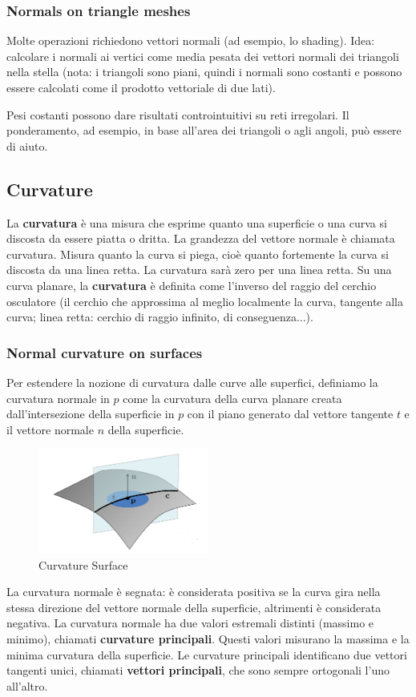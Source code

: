 \subsubsection{Normals on triangle meshes}
Molte operazioni richiedono vettori normali (ad esempio, lo shading). Idea: calcolare i normali ai vertici come media pesata dei vettori normali dei triangoli nella stella (nota: i triangoli sono piani, quindi i normali sono costanti e possono essere calcolati come il prodotto vettoriale di due lati).

Pesi costanti possono dare risultati controintuitivi su reti irregolari. Il ponderamento, ad esempio, in base all'area dei triangoli o agli angoli, può essere di aiuto.
\subsection{Curvature}
La \textbf{curvatura} è una misura che esprime quanto una superficie o una curva si discosta da essere piatta o dritta.
La grandezza del vettore normale è chiamata curvatura. Misura quanto la curva si piega, cioè quanto fortemente la curva si discosta da una linea retta. La curvatura sarà zero per una linea retta.
Su una curva planare, la \textbf{curvatura} è definita come l'inverso del raggio del cerchio osculatore (il cerchio che approssima al meglio localmente la curva, tangente alla curva; linea retta: cerchio di raggio infinito, di conseguenza...).
\subsubsection{Normal curvature on surfaces}
Per estendere la nozione di curvatura dalle curve alle superfici, definiamo la curvatura normale in $p$ come la curvatura della curva planare creata dall'intersezione della superficie in $p$ con il piano generato dal vettore tangente $t$ e il vettore normale $n$ della superficie.
\begin{figure}[H]
    \centering
    \includegraphics[width=0.5\textwidth]{images/CurvSurf.png} 
    \caption{Curvature Surface}
    \label{fig:immagine}
\end{figure}
La curvatura normale è segnata: è considerata positiva se la curva gira nella stessa direzione del vettore normale della superficie, altrimenti è considerata negativa.
La curvatura normale ha due valori estremali distinti (massimo e minimo), chiamati \textbf{curvature principali}. Questi valori misurano la massima e la minima curvatura della superficie.
Le curvature principali identificano due vettori tangenti unici, chiamati \textbf{vettori principali}, che sono sempre ortogonali l'uno all'altro.
